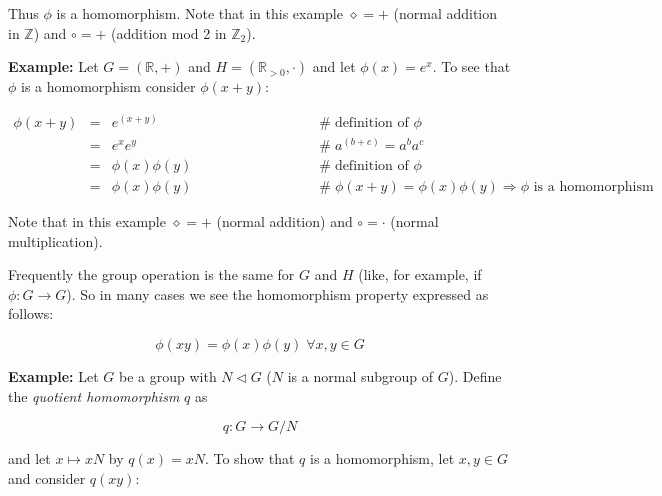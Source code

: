 \documentclass{article}
\theoremstyle{definition}
\begin{document}
 \bigskip
 \noindent
Thus $\phi$ is a homomorphism. Note that in this example
$\diamond = +$ (normal addition in $\mathbb{Z}$) and $\circ = +$
(addition mod 2 in $\mathbb{Z}_2$).



\bigskip
\noindent
\textbf{Example:} Let $G = (\mathbb{R}, +)$ and $H =
(\mathbb{R}_{> 0}, \cdot)$ and let $\phi(x) = e^x$. To see that
$\phi$ is a homomorphism consider $\phi(x + y)$:

\begin{equation*}
\begin{array}{rcll}
\phi(x + y) 
&=& e^{(x + y)}          
		&\hspace{8em} \mathrel{\#} \text{definition of $\phi$} \\
[3pt]
&=& e^x e^y
		&\hspace{8em} \mathrel{\#} a^{(b + c)} = a^b a^c \\
[3pt]
&=& \phi(x) \phi(y)
		&\hspace{8em} \mathrel{\#} \text{definition of $\phi$} \\
[3pt]
&=& \phi(x) \phi(y)
		&\hspace{8em} \mathrel{\#} \phi(x + y) = \phi(x) \phi(y) 
		 \Rightarrow \text{$\phi$ is a homomorphism}
\end{array}
\end{equation*}

\bigskip
\noindent
Note that in this example $\diamond = +$ (normal addition) and
$\circ = \cdot$ (normal multiplication).  

\bigskip
\noindent
Frequently the group operation is the same for $G$ and $H$ (like,
for example, if $\phi: G \rightarrow G$). So in many cases we see
the homomorphism property expressed as follows:

\begin{equation*}
\phi(xy) = \phi(x)\phi(y) \; \forall x,y \in G
\end{equation*}

\bigskip
\noindent
\textbf{Example:} Let $G$ be a group with $N \lhd G$ ($N$ is a
normal subgroup of $G$). Define the \emph{quotient homomorphism}
$q$ as

\begin{equation*}
q: G \rightarrow  G/N 
\end{equation*}

\bigskip
\noindent
and let $x \mapsto xN$ by $q(x) = xN$. To show that $q$ is a
homomorphism, let $x,y \in G$ and consider $q(xy)$:
\end{document}
